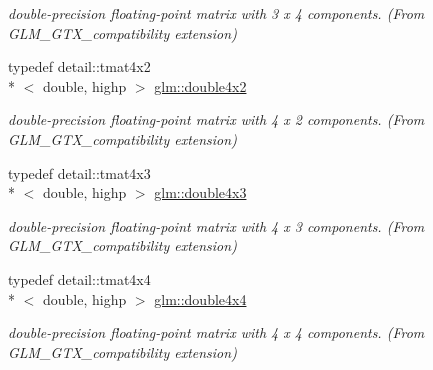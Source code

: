 \begin{DoxyCompactItemize}
\begin{DoxyCompactList}\small\item\em double-\/precision floating-\/point matrix with 3 x 4 components. (From G\-L\-M\-\_\-\-G\-T\-X\-\_\-compatibility extension) \end{DoxyCompactList}\item 
\hypertarget{group__gtx__compatibility_ga816d1a516a5ec13511fe1ae703ddcf94}{typedef detail\-::tmat4x2\\*
$<$ double, highp $>$ \hyperlink{group__gtx__compatibility_ga816d1a516a5ec13511fe1ae703ddcf94}{glm\-::double4x2}}\label{group__gtx__compatibility_ga816d1a516a5ec13511fe1ae703ddcf94}

\begin{DoxyCompactList}\small\item\em double-\/precision floating-\/point matrix with 4 x 2 components. (From G\-L\-M\-\_\-\-G\-T\-X\-\_\-compatibility extension) \end{DoxyCompactList}\item 
\hypertarget{group__gtx__compatibility_ga1199ee41226db53d5f190d0628041845}{typedef detail\-::tmat4x3\\*
$<$ double, highp $>$ \hyperlink{group__gtx__compatibility_ga1199ee41226db53d5f190d0628041845}{glm\-::double4x3}}\label{group__gtx__compatibility_ga1199ee41226db53d5f190d0628041845}

\begin{DoxyCompactList}\small\item\em double-\/precision floating-\/point matrix with 4 x 3 components. (From G\-L\-M\-\_\-\-G\-T\-X\-\_\-compatibility extension) \end{DoxyCompactList}\item 
\hypertarget{group__gtx__compatibility_ga95e88bfe8dea34a6d4b30b1029c3e2da}{typedef detail\-::tmat4x4\\*
$<$ double, highp $>$ \hyperlink{group__gtx__compatibility_ga95e88bfe8dea34a6d4b30b1029c3e2da}{glm\-::double4x4}}\label{group__gtx__compatibility_ga95e88bfe8dea34a6d4b30b1029c3e2da}

\begin{DoxyCompactList}\small\item\em double-\/precision floating-\/point matrix with 4 x 4 components. (From G\-L\-M\-\_\-\-G\-T\-X\-\_\-compatibility extension) \end{DoxyCompactList}\end{DoxyCompactItemize}
